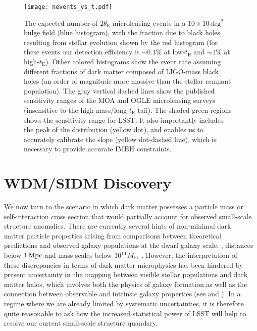 \begin{figure}[t]
\centering
\texttt{[image: nevents\_vs\_t.pdf]}
\caption{
    \label{fig:macho_discovery}
    The expected number of $2\theta_\mathrm{E}$ microlensing events in a $10\times10\,\mathrm{deg}^2$ bulge field (blue histogram), with the fraction due to black holes resulting from stellar evolution shown by the red histogram (for these events our detection efficiency is $\sim0.1\%$ at low-$t_\mathrm{E}$ and $\sim1\%$ at high-$t_\mathrm{E}$).
    Other colored histograms show the event rate assuming different fractions of dark matter composed of LIGO-mass black holes (an order of magnitude more massive than the stellar remnant population).
    The gray vertical dashed lines show the published sensitivity ranges of the MOA and OGLE microlensing surveys (insensitive to the high-mass/long-$t_\mathrm{E}$ tail).
    The shaded green regions shows the sensitivity range for LSST.
    It also importantly includes the peak of the distribution (yellow dot), and enables us to accurately calibrate the slope (yellow dot-dashed line), which is necessary to provide accurate IMBH constraints.
    }
\end{figure}

\section{WDM/SIDM Discovery}


We now turn to the scenario in which dark matter possesses a particle mass or self-interaction cross section that would partially account for observed small-scale structure anomalies.
There are currently several hints of non-minimal dark matter particle properties arising from comparisons between theoretical predictions and observed galaxy populations at the dwarf galaxy scale, \ie, distances below $1 \mathrm{\,Mpc}$ and mass scales below $10^{11} M_\odot$ \citep[reviewed by][]{BuckleyPeter:2017,Bullock:2017xww}.
However, the interpretation of these discrepancies in terms of dark matter microphysics has been hindered by present uncertainty in the mapping between visible stellar populations and dark matter halos, which involves both the physics of galaxy formation as well as the connection between observable and intrinsic galaxy properties (see  and ).
In a regime where we are already limited by systematic uncertainties, it is therefore quite reasonable to ask how the increased statistical power of LSST will help to resolve our current small-scale structure quandary.

